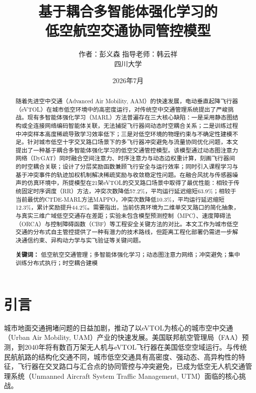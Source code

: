 \documentclass[12pt,a4paper,UTF8]{ctexart}
\title{\textbf{基于耦合多智能体强化学习的\\低空航空交通协同管控模型}}
\author{作者：彭义森 \quad 指导老师：韩云祥 \\ 四川大学}
\date{2026年7月}
\begin{document}
\maketitle

\begin{abstract}
随着先进空中交通（Advanced Air Mobility, AAM）的快速发展，电动垂直起降飞行器（eVTOL）在城市低空环境中的高密度运行，对传统空中交通管理系统提出了严峻挑战。现有多智能体强化学习（MARL）方法普遍存在三大核心缺陷：一是采用静态图结构或全连接网络编码智能体关联，无法捕捉飞行器间动态时空耦合关系；二是训练过程中冲突样本高度稀疏导致学习效率低下；三是对低空环境的物理约束与不确定性建模不足。针对城市低空十字交叉路口场景下的多飞行器冲突避免与流量协同优化问题，本文提出了一种基于耦合多智能体强化学习的低空交通管控模型。该模型通过动态图注意力网络（DyGAT）同时融合空间注意力、时序注意力与动态边权重计算，刻画飞行器间的时空耦合关联；设计了分层奖励函数兼顾飞行安全与运行效率；同时引入课程学习与基于冲突事件的轨迹加权机制解决稀疏奖励与收敛稳定性问题。在融合风扰与传感器噪声的仿真环境中，所提模型在21架eVTOL的交叉路口场景中取得了最优性能：相较于传统固定时序调度（RR）方法，冲突次数降低57.2\%，平均运行延迟缩短63.9\%；相较于当前最优的CTDE-MARL方法MAPPO，冲突次数降低10.3\%，平均运行延迟缩短12.3\%，累计奖励提升44.2\%。需要指出，当前仿真环境为二维单交叉路口的简化抽象，与真实三维广域低空交通存在差距；实验未包含模型预测控制（MPC）、速度障碍法（ORCA）与控制障碍函数（CBF）等工程安全关键方法的对比。本文工作为城市低空交通的分布式自主管控提供了一种有潜力的技术路线，但距离工程化部署仍需进一步解决通信约束、异构动力学与实飞验证等关键问题。

\noindent \textbf{关键词：} 低空航空交通管理；多智能体强化学习；动态图注意力网络；冲突避免；集中训练分布式执行；时空耦合建模
\end{abstract}

\section{引言}

城市地面交通拥堵问题的日益加剧，推动了以eVTOL为核心的城市空中交通（Urban Air Mobility, UAM）产业的快速发展。美国联邦航空管理局（FAA）预测，到2040年将有数百万架无人机与eVTOL飞行器在美国低空空域运行。与传统民航航路的结构化交通不同，城市低空交通具有高密度、强动态、高异构性的特征，飞行器在交叉路口与汇合点的协同管控与冲突避免，已成为低空无人机交通管理系统（Unmanned Aircraft System Traffic Management, UTM）面临的核心挑战。
\end{document}
